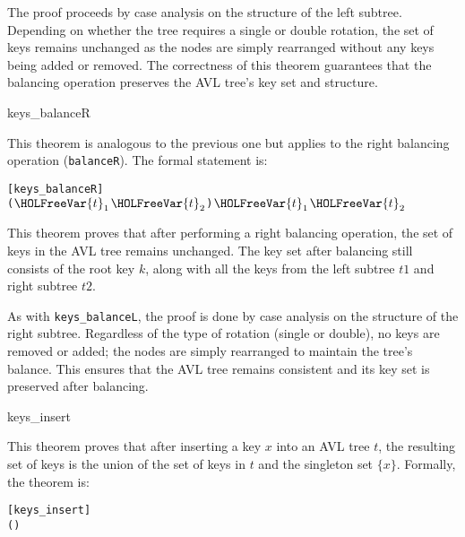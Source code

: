 The proof proceeds by case analysis on the structure of the left subtree. Depending on whether the tree requires a single or double rotation, the set of keys remains unchanged as the nodes are simply rearranged without any keys being added or removed. The correctness of this theorem guarantees that the balancing operation preserves the AVL tree's key set and structure.
\begin{thm}{keys\_balanceR}

This theorem is analogous to the previous one but applies to the right balancing operation (\texttt{balanceR}). The formal statement is:

\begin{alltt}
	[keys_balanceR]
	\HOLTokenTurnstile{}  (   \ensuremath{\HOLFreeVar{t}\sb{\mathrm{1}}} \ensuremath{\HOLFreeVar{t}\sb{\mathrm{2}}}) \HOLSymConst{=} \HOLTokenLeftbrace{}\HOLTokenRightbrace{} \HOLSymConst{\HOLTokenUnion{}}  \ensuremath{\HOLFreeVar{t}\sb{\mathrm{1}}} \HOLSymConst{\HOLTokenUnion{}}  \ensuremath{\HOLFreeVar{t}\sb{\mathrm{2}}}
\end{alltt}
\end{thm}

This theorem proves that after performing a right balancing operation, the set of keys in the AVL tree remains unchanged. The key set after balancing still consists of the root key \( k \), along with all the keys from the left subtree \( t1 \) and right subtree \( t2 \).

As with \texttt{keys\_balanceL}, the proof is done by case analysis on the structure of the right subtree. Regardless of the type of rotation (single or double), no keys are removed or added; the nodes are simply rearranged to maintain the tree’s balance. This ensures that the AVL tree remains consistent and its key set is preserved after balancing.

\begin{thm}{keys\_insert}

This theorem proves that after inserting a key \(x\) into an AVL tree \(t\), the resulting set of keys is the union of the set of keys in \(t\) and the singleton set \(\{x\}\). Formally, the theorem is:


\begin{alltt}
	[keys_insert]
	\HOLTokenTurnstile{}  (   ) \HOLSymConst{=}   \HOLSymConst{\HOLTokenUnion{}} \HOLTokenLeftbrace{}\HOLTokenRightbrace{}
\end{alltt}
\end{thm}


